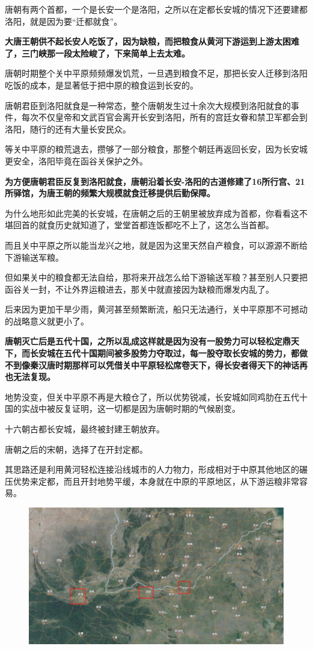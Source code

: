 \documentclass[UTF8, 11pt, oneside]{ctexart}
\newcommand{\zd}[1]{\textbf{\textcolor[RGB]{123,12,0}{#1}}} %
\begin{document}
唐朝有两个首都，一个是长安一个是洛阳，之所以在定都长安城的情况下还要建都洛阳，就是因为要“迁都就食”。

\zd{大唐王朝供不起长安人吃饭了，因为缺粮，而把粮食从黄河下游运到上游太困难了，三门峡那一段太险峻了，下来简单上去太难。}

唐朝时期整个关中平原频频爆发饥荒，一旦遇到粮食不足，那把长安人迁移到洛阳吃饭的成本，是显著低于把中原的粮食运到长安的。

唐朝君臣到洛阳就食是一种常态，整个唐朝发生过十余次大规模到洛阳就食的事件，每次不仅皇帝和文武百官会离开长安到洛阳，所有的宫廷女眷和禁卫军都会到洛阳，随行的还有大量长安民众。

等关中平原的粮荒退去，攒够了一部分粮食，那整个朝廷再返回长安，因为长安城更安全，洛阳毕竟在函谷关保护之外。

\zd{为方便唐朝君臣反复到洛阳就食，唐朝沿着长安-洛阳的古道修建了16所行宫、21所驿馆，为唐王朝的频繁大规模就食迁移提供后勤保障。}

为什么地形如此完美的长安城，在唐朝之后的王朝里被放弃成为首都，你看看这不堪回首的就食历史就知道了，堂堂首都连饭都吃不上了，这怎么当首都。

而且关中平原之所以能当龙兴之地，就是因为这里天然自产粮食，可以源源不断给下游输送军粮。

但如果关中的粮食都无法自给，那将来开战怎么给下游输送军粮？甚至别人只要把函谷关一封，不让外界运粮进去，那关中就直接因为缺粮而爆发内乱了。

后来因为更加干旱少雨，黄河甚至频繁断流，船只无法通行，关中平原那不可撼动的战略意义就更小了。

\zd{唐朝灭亡后是五代十国，之所以乱成这样就是因为没有一股势力可以轻松定鼎天下，而长安城在五代十国期间被多股势力夺取过，每一股夺取长安城的势力，都做不到像秦汉唐时期那样可以凭借关中平原轻松席卷天下，得长安者得天下的神话再也无法复现。}

地势没变，但关中平原不再是大粮仓了，所以优势锐减，长安城如同鸡肋在五代十国的实战中被反复证明，这一切都是因为唐朝时期的气候剧变。

十六朝古都长安城，最终被封建王朝放弃。

唐朝之后的宋朝，选择了在开封定都。

其思路还是利用黄河轻松连接沿线城市的人力物力，形成相对于中原其他地区的碾压优势来定都，而且开封地势平缓，本身就在中原的平原地区，从下游运粮非常容易。

\begin{figure}[H]
    \centering
    \includegraphics[width=13cm]{2024-08-19-007.jpg}
\end{figure}
\end{document}
